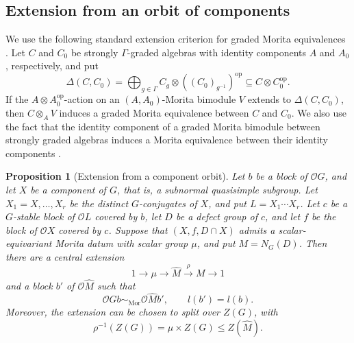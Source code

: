 \documentclass[11pt,a4paper]{article}
\newtheorem{proposition}[theorem]{Proposition}
\theoremstyle{definition}
\theoremstyle{remark}
\numberwithin{equation}{section}
\newcommand{\cO}{\mathcal{O}}
\newcommand{\Mor}{\mathrm{Mor}}
\newcommand{\op}{\mathrm{op}}
\begin{document}
	\subsection{Extension from an orbit of components}
	
	We use the following standard extension criterion for graded
	Morita equivalences \cite[Theorem~5.1.2]{Marcus1999}.
	Let $C$ and $C_0$ be strongly $\Gamma$-graded algebras with
	identity components $A$ and $A_0$, respectively, and put
	\[
	\Delta(C,C_0)=\bigoplus_{g\in\Gamma}
	C_g\otimes((C_0)_{g^{-1}})^{\op}
	\subseteq C\otimes C_0^{\op}.
	\]
	If the $A\otimes A_0^{\op}$-action on an $(A,A_0)$-Morita
	bimodule $V$ extends to $\Delta(C,C_0)$, then
	$C\otimes_A V$ induces a graded Morita equivalence
	between $C$ and $C_0$.
	We also use the fact that the identity component of a graded
	Morita bimodule between strongly graded algebras induces a
	Morita equivalence between their identity components
	\cite[p.~74]{MarcusMinuta2020}.
	
	\begin{proposition}[Extension from a component orbit]\label{prop:quotient-induction}
		Let $b$ be a block of $\cO G$, and let $X$ be a component of $G$,
		that is, a subnormal quasisimple subgroup.
		Let $X_1=X,\ldots,X_r$ be the distinct $G$-conjugates of $X$,
		and put $L=X_1\cdots X_r$. Let $c$ be a $G$-stable block of
		$\cO L$ covered by $b$, let $D$ be a defect group of $c$, and
		let $f$ be the block of $\cO X$ covered by $c$.
		Suppose that $(X,f,D\cap X)$ admits a scalar-equivariant Morita
		datum with scalar group $\mu$, and put $M=N_G(D)$.
		Then there are a central extension
		\[
		1\longrightarrow\mu\longrightarrow\widehat M
		\xrightarrow{\rho}M\longrightarrow1
		\]
		and a block $b'$ of $\cO\widehat M$ such that
		\[
		\cO Gb\sim_{\Mor}\cO\widehat M b',\qquad l(b')=l(b).
		\]
		Moreover, the extension can be chosen to split over $Z(G)$, with
		\[
		\rho^{-1}(Z(G))=\mu\times Z(G)\leq Z(\widehat M).
		\]
	\end{proposition}
	
\end{document}
